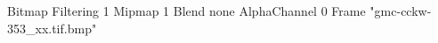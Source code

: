 {Bitmap
	{Filtering 1}
	{Mipmap 1}
	{Blend none}
	{AlphaChannel 0}
	{Frame "gmc-cckw-353_xx.tif.bmp"}
}
